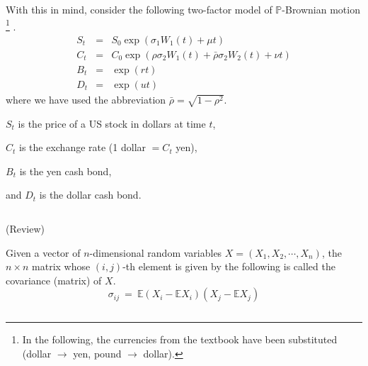 \documentclass[uplatex,a4j,12pt,dvipdfmx]{jsarticle}
\begin{document}
With this in mind, consider the following two-factor model of $\mathbb{P}$-Brownian motion
%
\footnote{In the following, the currencies from the textbook have been substituted (dollar $\to$ yen, pound $\to$ dollar).}
%
.
%
%
\begin{eqnarray*}
	S_{t}
	&=&
	S_{0}
	\exp \left( \sigma_{1} W_{1}(t) + \mu t \right)
	\\
	C_{t}
	&=&
	C_{0}
	\exp \left(
	\rho \sigma_{2} W_{1}(t) +
	\bar{\rho} \sigma_{2} W_{2}(t) + \nu t \right)
	\\
	B_{t}
	&=&
	\exp (rt)
	\\
	D_{t}
	&=&
	\exp (ut)
\end{eqnarray*}
%
%
where we have used the abbreviation $\bar{\rho} = \sqrt{1 - \rho^{2}}$.

$S_{t}$ is the price of a US stock in dollars at time $t$,

$C_{t}$ is the exchange rate (1 dollar $=C_{t}$ yen),

$B_{t}$ is the yen cash bond,

and $D_{t}$ is the dollar cash bond.

${}$

(Review)

Given a vector of $n$-dimensional random variables $X =(X_{1},X_{2},\cdots,X_{n})$,
the $n \times n$ matrix whose $(i,j)$-th element is given by the following
is called the covariance (matrix) of $X$.
$$
	\mathbb{\sigma}_{ij}
	\ = \
	\mathbb{E}
	(X_{i} - \mathbb{E} X_{i})
	(X_{j} - \mathbb{E} X_{j})
$$

${}$
\end{document}
